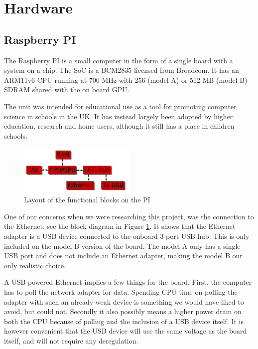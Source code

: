 \clearpage
\section{Hardware}
\label{sec:hardware}

\subsection{Raspberry PI}
The Raspberry PI is a small computer in the form of a single board with a system on a chip. The SoC is a BCM2835 licensed from Broadcom. It has an ARM11v6 CPU running at 700 MHz with 256 (model A) or 512 MB (model B) SDRAM shared with the on board GPU. 

The unit was intended for educational use as a tool for promoting computer science in schools in the UK. It has instead largely been adopted by higher education, research and home users, although it still has a place in children schools.

\begin{figure}[h]
	\centering
    \includegraphics[width=0.5\textwidth]{hardware/raspberrypi_block_function}
    \caption{Layout of the functional blocks on the PI}
    \label{fig:pi_blockdiagram}
\end{figure}

One of our concerns when we were researching this project, was the connection to the Ethernet, see the block diagram in Figure \ref{fig:pi_blockdiagram}.
It shows that the Ethernet adapter is a USB device connected to the onboard 3-port USB hub. This is only included on the model B version of the board. 
The model A only has a single USB port and does not include an Ethernet adapter, making the model B our only realistic choice.

A USB powered Ethernet implies a few things for the board. First, the computer has to poll the network adapter for data. 
Spending CPU time on polling the adapter with such an already weak device is something we would have liked to avoid, but could not. Secondly it also possibly means a higher power drain on both the CPU because of polling and the inclusion of a USB device itself.
It is however convenient that the USB device will use the same voltage as the board itself, and will not require any deregulation. 

